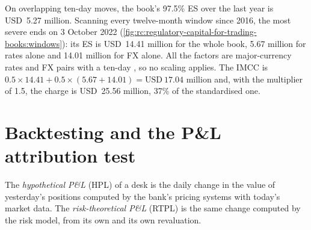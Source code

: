 \begin{example}\label{ex:rc:regulatory-capital-for-trading-books:ima}
On overlapping ten-day moves, the book's 97.5\% ES over the last year is USD~5.27 million. Scanning
every twelve-month window since 2016, the most severe ends on 3 October 2022
(\cref{fig:rc:regulatory-capital-for-trading-books:windows}): its ES is USD~14.41 million for the whole
book, 5.67 million for rates alone and 14.01 million for FX alone. All the factors are major-currency
rates and FX pairs with a ten-day , so no scaling applies. The IMCC is
$0.5\times14.41+0.5\times(5.67+14.01) = \text{USD}~17.04$ million and, with the multiplier of 1.5, the charge
is USD~25.56 million, 37\% of the standardised one.
\end{example}

\begin{omfigure}

\label{fig:rc:regulatory-capital-for-trading-books:windows}
\end{omfigure}

\section{Backtesting and the P\&L attribution test}

\begin{definition}\label{def:rc:regulatory-capital-for-trading-books:hpl}
The \emph{hypothetical P\&L} (HPL) of a desk is the daily change in the
value of yesterday's positions computed by the bank's pricing systems with today's market data.
The \emph{risk-theoretical P\&L} (RTPL) is the same change computed by
the risk model, from its own  and its own revaluation.
\end{definition}

